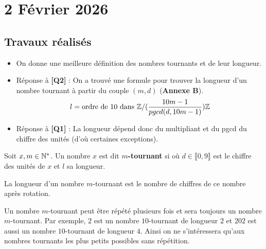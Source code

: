 \documentclass[a4paper,12pt]{article}
\begin{document}
\clearpage

\section{2 Février 2026}

\subsection*{Travaux réalisés}

    \begin{itemize}[label=\textbullet]
        \item On donne une meilleure définition des nombres tournants et de leur longueur.
        \item Réponse à \textbf{[Q2]} : On a trouvé une formule pour trouver la longueur d'un nombre tournant à partir du couple $(m, d)$ (\textbf{Annexe B}).
        $$
        l = \text{ordre de } 10 \text{ dans } \mathbb{Z}/(\dfrac{10m - 1}{pgcd(d, 10m - 1)})\mathbb{Z}
        $$
        \item Réponse à \textbf{[Q1]} : La longueur dépend donc du multipliant et du pgcd du chiffre des unités (d'où certaines exceptions).
    \end{itemize}

\begin{definition}
    Soit $x, m \in \mathbb{N}^*$.
    Un nombre $x$ est dit \textbf{$m$-tournant} si  où $d \in \llbracket 0, 9 \rrbracket$ est le chiffre des unités de $x$ et $l$ sa longueur.
\end{definition}

\begin{definition}
    La longueur d'un nombre $m$-tournant est le nombre de chiffres de ce nombre après rotation.
\end{definition}

\begin{remarque}
    Un nombre $m$-tournant peut être répété plusieurs fois et sera toujours un nombre $m$-tournant. Par exemple, $2$ est un nombre $10$-tournant de longueur $2$ et $202$ est aussi un nombre $10$-tournant de longueur $4$.
    Ainsi on ne s'intéressera qu'aux nombres tournants les plus petits possibles sans répétition.
\end{remarque}

\end{document}
